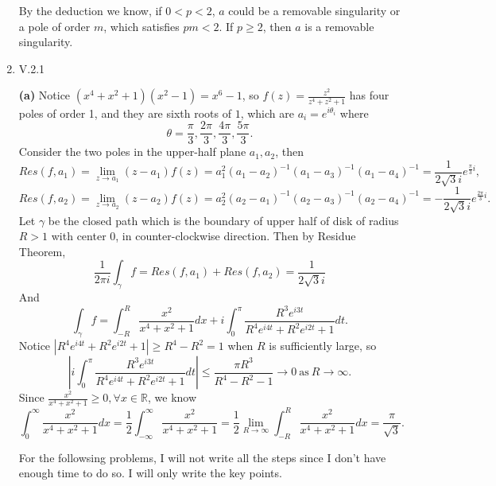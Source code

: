 \documentclass{article}%
\begin{document}
\begin{enumerate}
By the deduction we know, if $0 < p < 2$, $a$ could be a removable singularity or a pole of order $m$, which satisfies $pm < 2$. If $p \ge 2$, then $a$ is a removable singularity.


\item V.2.1

\textbf{(a)} Notice $(x^4+x^2+1)(x^2-1) = x^6-1 $, so $f(z) = \frac{z^2}{z^4+z^2+1}$ has four poles of order 1, and they are sixth roots of $1$, which are $a_i = e^{i\theta_i} $ where
$$
\theta = \frac{\pi}{3}, \frac{2\pi}{3}, \frac{4\pi}{3}, \frac{5\pi}{3}.
$$
Consider the two poles in the upper-half plane $a_1, a_2 $, then
$$
Res(f, a_1) = \lim_{z\to a_1}(z-a_1)f(z) = a_1^2(a_1-a_2)^{-1}(a_1-a_3)^{-1}(a_1-a_4)^{-1} = \frac{1}{2\sqrt{3}i}e^{\frac{\pi}{3}i},
$$
$$
Res(f, a_2) = \lim_{z\to a_2}(z-a_2)f(z) = a_2^2(a_2-a_1)^{-1}(a_2-a_3)^{-1}(a_2-a_4)^{-1} = -\frac{1}{2\sqrt{3}i}e^{\frac{2\pi}{3}i}.
$$
Let $\gamma$ be the closed path which is the boundary of upper half of disk of radius $R > 1$ with center 0, in counter-clockwise direction. Then by Residue Theorem, 
$$
\frac{1}{2\pi i}\int_{\gamma}f =  Res(f, a_1)+Res(f, a_2) = \frac{1}{2\sqrt{3}i}
$$
And
$$
\int_{\gamma}f = \int_{-R}^{R}\frac{x^2}{x^4+x^2+1}dx + i\int_{0}^{\pi}\frac{R^3e^{i3t}}{R^4e^{i4t}+R^2e^{i2t}+1}dt.
$$
Notice $|R^4e^{i4t}+R^2e^{i2t}+1| \ge R^4-R^2=1 $ when $R$ is sufficiently large, so
$$
\left|i\int_{0}^{\pi}\frac{R^3e^{i3t}}{R^4e^{i4t}+R^2e^{i2t}+1}dt\right| \le \frac{\pi R^3}{R^4-R^2-1} \to 0 ~\text{as}~ R\to\infty.
$$
Since $\frac{x^2}{x^4+x^2+1} \ge 0, \forall x\in\mathbb{R}$, we know
$$
\int_{0}^{\infty}\frac{x^2}{x^4+x^2+1}dx = \frac{1}{2}\int_{-\infty}^{\infty}\frac{x^2}{x^4+x^2+1} = \frac{1}{2}\lim_{R\to\infty}\int_{-R}^{R}\frac{x^2}{x^4+x^2+1}dx = \frac{\pi}{\sqrt{3}}.
$$

For the followsing problems, I will not write all the steps since I don't have enough time to do so. I will only write the key points.



\end{enumerate}
\end{document}
